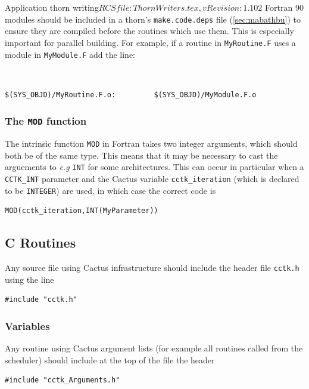 \begin{cactuspart}{2}{Application thorn writing}{$RCSfile: ThornWriters.tex,v $}{$Revision: 1.102 $}
Fortran 90 modules should be included in a thorn's {\tt make.code.deps} file
(\ref{sec:mabathbu}) to ensure they are compiled before the
routines which use them. This is especially important for parallel
building. For example, if a routine in {\tt MyRoutine.F} uses a module
in {\tt MyModule.F} add the line:
{\tt
\begin{verbatim}
$(SYS_OBJD)/MyRoutine.F.o:         $(SYS_OBJD)/MyModule.F.o
\end{verbatim}
}

\subsubsection{The {\tt MOD} function}

The intrinsic function {\tt MOD} in Fortran takes two integer
arguments, which should both be of the same type. This means
that it may be necessary to cast the arguements to {\it e.g}
{\tt INT} for some architectures. This can occur in particular
when a {\tt CCTK\_INT} parameter and the Cactus variable {\tt cctk\_iteration}
(which is declared to be {\tt INTEGER}) are used,
in which case the correct code is
\begin{verbatim}
MOD(cctk_iteration,INT(MyParameter))
\end{verbatim}


\subsection{C Routines}

Any source file using Cactus infrastructure should include
the header file {\tt cctk.h} using the line
\begin{verbatim}
#include "cctk.h"
\end{verbatim}

\subsubsection{Variables}

Any routine using Cactus argument lists (for example all
routines called from the scheduler) should include at the
top of the file the header
\begin{verbatim}
#include "cctk_Arguments.h"
\end{verbatim}


\end{cactuspart}
